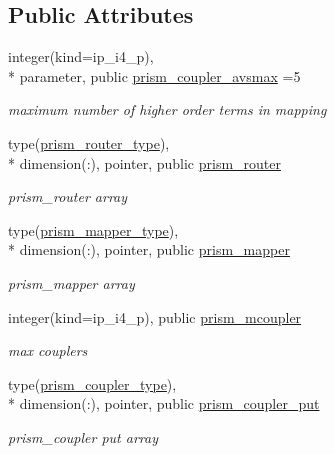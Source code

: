 \subsection*{Public Attributes}
\begin{DoxyCompactItemize}
\item 
integer(kind=ip\+\_\+i4\+\_\+p), \\*
parameter, public \hyperlink{classmod__oasis__coupler_a6f166f099a134dffba97a168d28a3c01}{prism\+\_\+coupler\+\_\+avsmax} =5
\begin{DoxyCompactList}\small\item\em maximum number of higher order terms in mapping \end{DoxyCompactList}\item 
type(\hyperlink{structmod__oasis__coupler_1_1prism__router__type}{prism\+\_\+router\+\_\+type}), \\*
dimension(\+:), pointer, public \hyperlink{classmod__oasis__coupler_a33dbf692ad73f83f73fe083e252badd8}{prism\+\_\+router}
\begin{DoxyCompactList}\small\item\em prism\+\_\+router array \end{DoxyCompactList}\item 
type(\hyperlink{structmod__oasis__coupler_1_1prism__mapper__type}{prism\+\_\+mapper\+\_\+type}), \\*
dimension(\+:), pointer, public \hyperlink{classmod__oasis__coupler_a2b968dbcb61e7aed11074494ab041cd4}{prism\+\_\+mapper}
\begin{DoxyCompactList}\small\item\em prism\+\_\+mapper array \end{DoxyCompactList}\item 
integer(kind=ip\+\_\+i4\+\_\+p), public \hyperlink{classmod__oasis__coupler_aaa019c39b0f657e7c37820697ecf354a}{prism\+\_\+mcoupler}
\begin{DoxyCompactList}\small\item\em max couplers \end{DoxyCompactList}\item 
type(\hyperlink{structmod__oasis__coupler_1_1prism__coupler__type}{prism\+\_\+coupler\+\_\+type}), \\*
dimension(\+:), pointer, public \hyperlink{classmod__oasis__coupler_ae59d8823993d9ca8610efd9770393271}{prism\+\_\+coupler\+\_\+put}
\begin{DoxyCompactList}\small\item\em prism\+\_\+coupler put array \end{DoxyCompactList}\item 

\end{DoxyCompactItemize}
